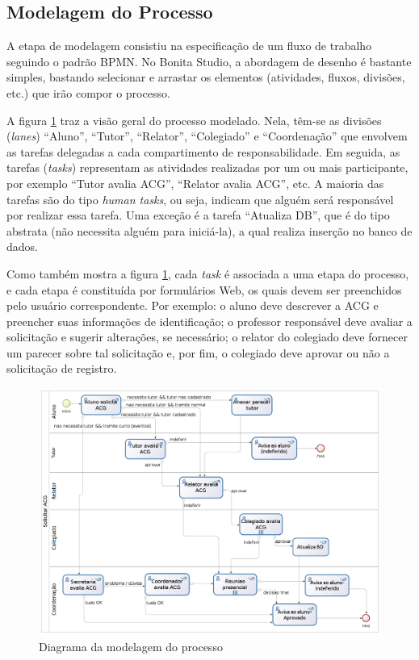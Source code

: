 \documentclass[12pt]{article}
\begin{document}
\subsection{Modelagem do Processo}

A etapa de modelagem consistiu na especificação de um fluxo de trabalho seguindo o padrão BPMN. No Bonita Studio, a abordagem de desenho é bastante simples, bastando selecionar e arrastar os elementos (atividades, fluxos, divisões, etc.) que irão compor o processo.

	A figura \ref{fig:diagrama} traz a visão geral do processo modelado. Nela, têm-se as divisões (\emph{lanes}) “Aluno”, “Tutor”, “Relator”, “Colegiado” e “Coordenação” que envolvem as tarefas delegadas a cada compartimento de responsabilidade. Em seguida, as tarefas  (\emph{tasks})  representam as atividades realizadas por um ou mais participante, por exemplo “Tutor avalia ACG”, “Relator avalia ACG”, etc. A maioria das tarefas são do tipo \emph{human tasks}, ou seja, indicam que alguém será responsável por realizar essa tarefa. Uma exceção é a tarefa “Atualiza DB”, que é do tipo abstrata (não necessita alguém para iniciá-la), a qual realiza inserção no banco de dados.

Como também mostra a figura \ref{fig:diagrama}, cada \emph{task}  é associada a uma etapa do processo, e cada etapa é constituída  por formulários Web, os quais devem ser preenchidos pelo usuário correspondente. Por exemplo: o aluno deve  descrever  a ACG e preencher  suas  informações  de  identificação;  o professor responsável deve avaliar a solicitação e sugerir alterações, se necessário; o relator do colegiado deve fornecer um parecer sobre tal solicitação e, por fim, o colegiado deve aprovar ou não a solicitação de registro.

\begin{figure}[ht]
\centering
\includegraphics[width=.99\textwidth]{images/processo.png}
\caption{Diagrama da modelagem do processo}
\label{fig:diagrama}
\end{figure}
\end{document}
